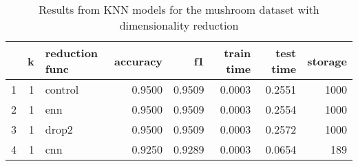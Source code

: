 \begin{table}
\caption{Results from KNN models for the mushroom dataset with dimensionality reduction}
\label{tab:knn_reduction_results_mushroom}
\begin{tabular}{rrlrrrrr}
\toprule
 & k & reduction func & accuracy & f1 & train time & test time & storage \\
\midrule
1 & 1 & control & 0.9500 & 0.9509 & 0.0003 & 0.2551 & 1000 \\
2 & 1 & enn & 0.9500 & 0.9509 & 0.0003 & 0.2554 & 1000 \\
3 & 1 & drop2 & 0.9500 & 0.9509 & 0.0003 & 0.2572 & 1000 \\
4 & 1 & cnn & 0.9250 & 0.9289 & 0.0003 & 0.0654 & 189 \\
\bottomrule
\end{tabular}
\end{table}
